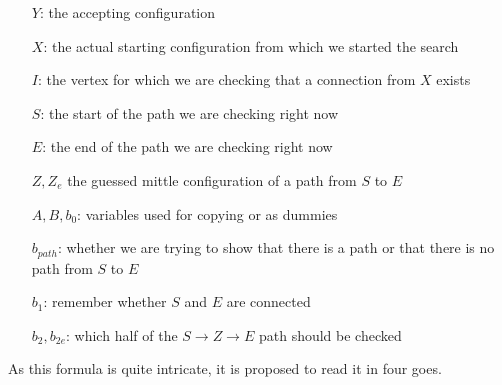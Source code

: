 \begin{itemize}
    \item[$Y$:] the accepting configuration
    \item[$X$:] the actual starting configuration from which we started the search
    \item[$I$:] the vertex for which we are checking that a connection from $X$ exists
    \item[$S$:] the start of the path we are checking right now
    \item[$E$:] the end of the path we are checking right now
    \item[$Z, Z_{e}$] the guessed mittle configuration of a path from $S$ to $E$
    \item[$A, B, b_{0}$:] variables used for copying or as dummies
    \item[$b_{path}$:] whether we are trying to show that there is a path or that there is no path from $S$ to $E$
    \item[$b_{1}$:] remember whether $S$ and $E$ are connected
    \item[$b_{2}, b_{2e}$:] which half of the $S \to Z \to E$ path should be checked
\end{itemize}
As this formula is quite intricate, it is proposed to read it in four goes.

